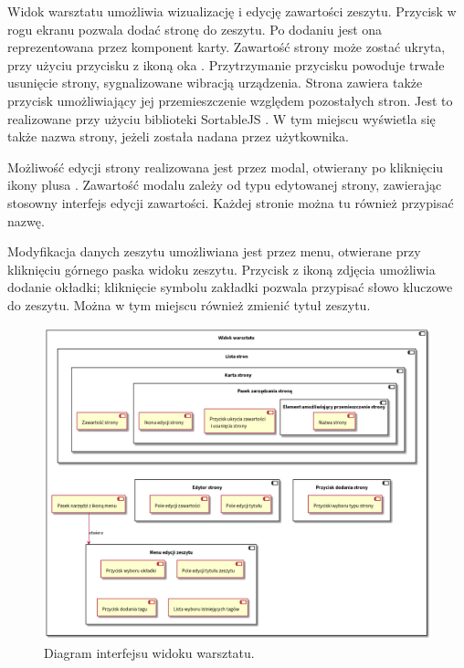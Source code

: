 Widok warsztatu umożliwia wizualizację i edycję zawartości zeszytu. Przycisk w rogu ekranu pozwala dodać stronę do zeszytu.
Po dodaniu jest ona reprezentowana przez komponent karty. Zawartość strony może zostać ukryta,
przy użyciu przycisku z ikoną oka \cite{ionic}. Przytrzymanie przycisku powoduje trwałe usunięcie strony, sygnalizowane wibracją urządzenia.
Strona zawiera także przycisk umożliwiający jej przemieszczenie względem pozostałych stron. Jest to realizowane przy użyciu
biblioteki SortableJS \cite{sortablejs}.
W tym miejscu wyświetla się także nazwa
strony, jeżeli została nadana przez użytkownika.

Możliwość edycji strony realizowana jest przez modal, otwierany po kliknięciu ikony plusa \cite{ionic}. Zawartość modalu zależy od
typu edytowanej strony, zawierając stosowny interfejs edycji zawartości. Każdej stronie można tu również przypisać nazwę.

Modyfikacja danych zeszytu umożliwiana jest przez menu, otwierane przy kliknięciu górnego paska widoku zeszytu.
Przycisk z ikoną zdjęcia \cite{ionic} umożliwia dodanie okładki; kliknięcie symbolu zakładki pozwala przypisać słowo kluczowe
do zeszytu. Można w tym miejscu również zmienić tytuł zeszytu.

\begin{figure}[H]
	\begin{center}
		\includegraphics[scale=0.4]{media/WorkshopInterface.png}
	\end{center}
	\caption{Diagram interfejsu widoku warsztatu.}
	\label{rys:workshop-interface}
\end{figure}


